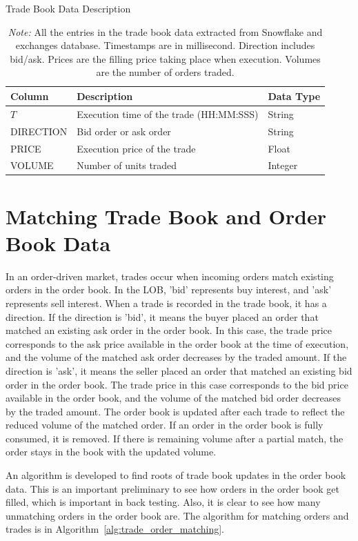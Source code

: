 \begin{table}[ht] 
    \centering 
    \caption{Trade Book Data Description}
    \caption*{\textit{Note:} All the entries in the trade book data extracted from Snowflake and exchanges database. Timestamps are in millisecond. Direction includes bid/ask. Prices are the filling price taking place when execution. Volumes are the number of orders traded.}
    \begin{tabular}{lll} 
        \toprule 
        \textbf{Column} & \textbf{Description} & \textbf{Data Type} \\ 
        \midrule 
        $T$ & Execution time of the trade (HH:MM:SSS) & String \\
        DIRECTION & Bid order or ask order & String \\
        PRICE & Execution price of the trade & Float \\ 
        VOLUME & Number of units traded & Integer \\  
        \bottomrule 
    \end{tabular} 
    \label{tb: trade book data description}  
\end{table}

\section{Matching Trade Book and Order Book Data} \label{sec:match-order-trade}
In an order-driven market, trades occur when incoming orders match existing orders in the order book. In the LOB, 'bid' represents buy interest, and 'ask' represents sell interest. When a trade is recorded in the trade book, it has a direction. If the direction is 'bid', it means the buyer placed an order that matched an existing ask order in the order book. In this case, the trade price corresponds to the ask price available in the order book at the time of execution, and the volume of the matched ask order decreases by the traded amount. If the direction is 'ask', it means the seller placed an order that matched an existing bid order in the order book. The trade price in this case corresponds to the bid price available in the order book, and the volume of the matched bid order decreases by the traded amount. The order book is updated after each trade to reflect the reduced volume of the matched order. If an order in the order book is fully consumed, it is removed. If there is remaining volume after a partial match, the order stays in the book with the updated volume. 

An algorithm is developed to find roots of trade book updates in the order book data. This is an important preliminary to see how orders in the order book get filled, which is important in back testing. Also, it is clear to see how many unmatching orders in the order book are. The algorithm for matching orders and trades is in Algorithm~\ref{alg:trade_order_matching}.

